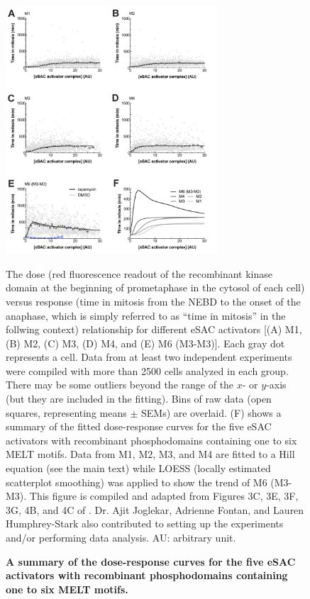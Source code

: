 \begin{figure}
    \centering
    \includegraphics[width=0.7\textwidth]{chapters/figures/DoseResponse.pdf}
    \caption{\textbf{A summary of the dose-response curves for the five eSAC activators with recombinant phosphodomains containing one to six MELT motifs.}}
    \noindent\justifying The dose (red fluorescence readout of the recombinant  kinase domain at the beginning of prometaphase in the cytosol of each cell) versus response (time in mitosis from the NEBD to the onset of the anaphase, which is simply referred to as ``time in mitosis'' in the follwing context) relationship for different eSAC activators [(A) M1, (B) M2, (C) M3, (D) M4, and (E) M6 (M3-M3)]. Each gray dot represents a cell. Data from at least two independent experiments were compiled with more than \SI{2500}{} cells analyzed in each group. There may be some outliers beyond the range of the $x$- or $y$-axis (but they are included in the fitting). Bins of raw data (open squares, representing means $\pm$ SEMs) are overlaid. (F) shows a summary of the fitted dose-response curves for the five eSAC activators with recombinant phosphodomains containing one to six MELT motifs. Data from M1, M2, M3, and M4 are fitted to a Hill equation (see the main text) while LOESS (locally estimated scatterplot smoothing) was applied to show the trend of M6 (M3-M3). This figure is compiled and adapted from Figures 3C, 3E, 3F, 3G, 4B, and 4C of \cite{eSAC}. Dr. Ajit Joglekar, Adrienne Fontan, and Lauren Humphrey-Stark also contributed to setting up the experiments and/or performing data analysis. AU: arbitrary unit.
    \label{DoseResponse}
\end{figure}

